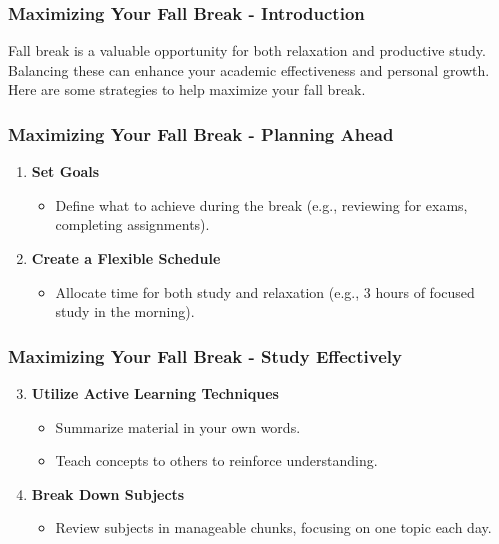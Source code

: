 \documentclass[aspectratio=169]{beamer}
\begin{document}
\begin{frame}[fragile]
    \frametitle{Maximizing Your Fall Break - Introduction}
    Fall break is a valuable opportunity for both relaxation and productive study. Balancing these can enhance your academic effectiveness and personal growth. Here are some strategies to help maximize your fall break.
\end{frame}

\begin{frame}[fragile]
    \frametitle{Maximizing Your Fall Break - Planning Ahead}
    \begin{enumerate}
        \item \textbf{Set Goals}
        \begin{itemize}
            \item Define what to achieve during the break (e.g., reviewing for exams, completing assignments).
        \end{itemize}
        
        \item \textbf{Create a Flexible Schedule}
        \begin{itemize}
            \item Allocate time for both study and relaxation (e.g., 3 hours of focused study in the morning).
        \end{itemize}
    \end{enumerate}
\end{frame}

\begin{frame}[fragile]
    \frametitle{Maximizing Your Fall Break - Study Effectively}
    \begin{enumerate}
        \setcounter{enumi}{2}
        \item \textbf{Utilize Active Learning Techniques}
        \begin{itemize}
            \item Summarize material in your own words.
            \item Teach concepts to others to reinforce understanding.
        \end{itemize}
        
        \item \textbf{Break Down Subjects}
        \begin{itemize}
            \item Review subjects in manageable chunks, focusing on one topic each day.
        \end{itemize}
    \end{enumerate}
\end{frame}
\end{document}
